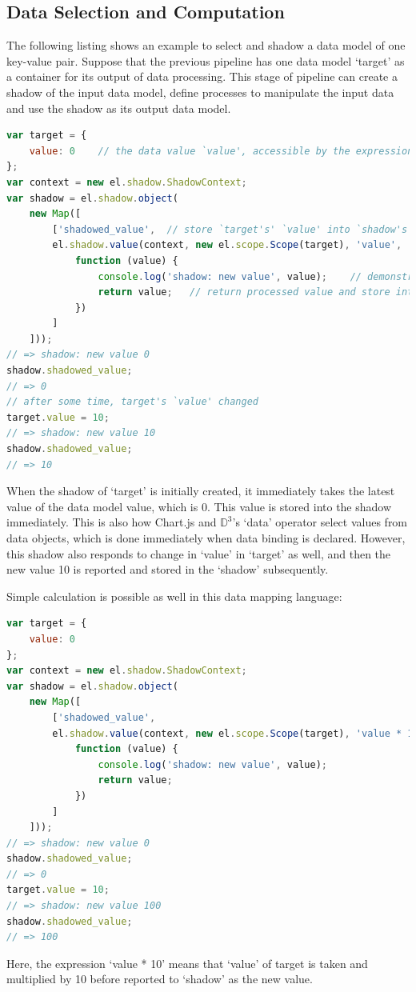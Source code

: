 \documentclass[11pt, a4paper]{report}
\begin{document}
\subsection{Data Selection and Computation}
The following listing shows an example to select and shadow a data model of one key-value pair. Suppose that the previous pipeline has one data model `target' as a container for its output of data processing. This stage of pipeline can create a shadow of the input data model, define processes to manipulate the input data and use the shadow as its output data model.
\begin{lstlisting}[language=javascript]
var target = {
	value: 0	// the data value `value', accessible by the expression `value'
};
var context = new el.shadow.ShadowContext;
var shadow = el.shadow.object(
	new Map([
		['shadowed_value',	// store `target's' `value' into `shadow's' `shadowed_value'
		el.shadow.value(context, new el.scope.Scope(target), 'value',
			function (value) {
				console.log('shadow: new value', value);	// demonstrate that shadow observe the change to the data model `target'
				return value;	// return processed value and store into shadow
			})
		]
	]));
// => shadow: new value 0
shadow.shadowed_value;
// => 0
// after some time, target's `value' changed
target.value = 10;
// => shadow: new value 10
shadow.shadowed_value;
// => 10
\end{lstlisting}
When the shadow of `target' is initially created, it immediately takes the latest value of the data model value, which is 0. This value is stored into the shadow immediately. This is also how Chart.js and $\mathbb D^3$'s `data' operator select values from data objects, which is done immediately when data binding is declared. However, this shadow also responds to change in `value' in `target' as well, and then the new value 10 is reported and stored in the `shadow' subsequently.

Simple calculation is possible as well in this data mapping language:
\begin{lstlisting}[language=javascript]
var target = {
	value: 0
};
var context = new el.shadow.ShadowContext;
var shadow = el.shadow.object(
	new Map([
		['shadowed_value',
		el.shadow.value(context, new el.scope.Scope(target), 'value * 10',
			function (value) {
				console.log('shadow: new value', value);
				return value;
			})
		]
	]));
// => shadow: new value 0
shadow.shadowed_value;
// => 0
target.value = 10;
// => shadow: new value 100
shadow.shadowed_value;
// => 100
\end{lstlisting}
Here, the expression `value * 10' means that `value' of target is taken and multiplied by 10 before reported to `shadow' as the new value.
\end{document}
